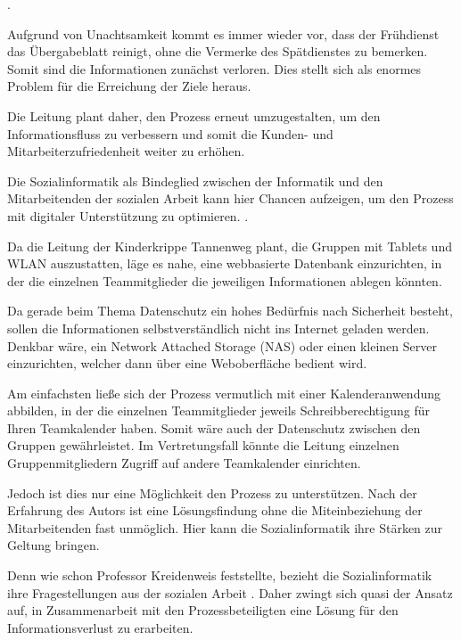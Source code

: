 \citep[][24]{kreidenweis2012}.

Aufgrund von Unachtsamkeit kommt es immer wieder vor, dass der Frühdienst das Übergabeblatt reinigt, ohne die Vermerke des Spätdienstes zu bemerken. Somit sind die Informationen zunächst verloren. Dies stellt sich als enormes Problem für die Erreichung der Ziele heraus.

Die Leitung plant daher, den Prozess erneut umzugestalten, um den Informationsfluss zu verbessern und somit die Kunden- und Mitarbeiterzufriedenheit weiter zu erhöhen.

Die Sozialinformatik als Bindeglied zwischen der Informatik und den Mitarbeitenden der sozialen Arbeit kann hier Chancen aufzeigen, um den Prozess mit digitaler Unterstützung zu optimieren. \citep[][90]{kreidenweis2012}.

Da die Leitung der Kinderkrippe Tannenweg plant, die Gruppen mit Tablets und WLAN auszustatten, läge es nahe, eine webbasierte Datenbank einzurichten, in der die einzelnen Teammitglieder die jeweiligen Informationen ablegen könnten. 

Da gerade beim Thema Datenschutz ein hohes Bedürfnis nach Sicherheit besteht, sollen die Informationen selbstverständlich nicht ins Internet geladen werden. Denkbar wäre, ein Network Attached Storage (NAS) oder einen kleinen Server einzurichten, welcher dann über eine Weboberfläche bedient wird.

Am einfachsten ließe sich der Prozess vermutlich mit einer Kalenderanwendung abbilden, in der die einzelnen Teammitglieder jeweils Schreibberechtigung für Ihren Teamkalender haben. Somit wäre auch der Datenschutz zwischen den Gruppen gewährleistet. Im Vertretungsfall könnte die Leitung einzelnen Gruppenmitgliedern Zugriff auf andere Teamkalender einrichten.

Jedoch ist dies nur eine Möglichkeit den Prozess zu unterstützen. Nach der Erfahrung des Autors ist eine Lösungsfindung ohne die Miteinbeziehung der Mitarbeitenden fast unmöglich. Hier kann die Sozialinformatik ihre Stärken zur Geltung bringen.

Denn wie schon Professor Kreidenweis feststellte, bezieht die Sozialinformatik ihre Fragestellungen aus der sozialen Arbeit \citep[vgl.][26]{kreidenweis2012}.
Daher zwingt sich quasi der Ansatz auf, in Zusammenarbeit mit den Prozessbeteiligten eine Lösung für den Informationsverlust zu erarbeiten.

